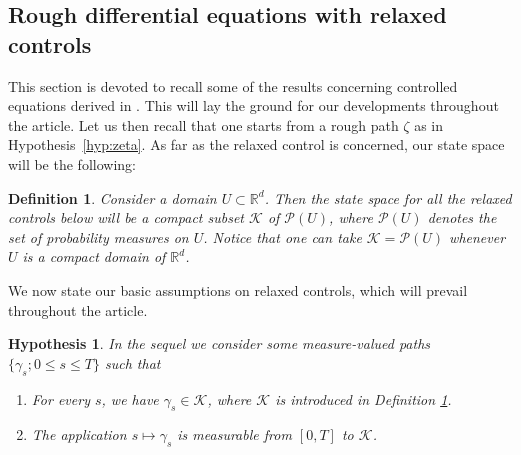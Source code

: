 \documentclass[12pt,reqno]{amsart}
\numberwithin{equation}{section}  %
\newcommand{\1}{{\bf 1}}
\newcommand{\2}{{\bf 2}}
\newcommand{\bzeta}{{\zeta}}
\newcommand{\R}{\mathbb R}
\newcommand{\ck}{\mathcal K}
\newcommand{\cp}{\mathcal P}
\newcommand{\cv}{\mathcal V}
\newcommand{\ga}{\gamma}
\newtheorem{definition}[theorem]{Definition}
\newtheorem{hypothesis}[theorem]{Hypothesis}
\theoremstyle{remark}
\theoremstyle{remark}
\begin{document}
\subsection{Rough differential equations with relaxed controls}
This section is devoted to recall some of the results concerning controlled equations derived in \cite{CHT}. This will lay the ground for our developments throughout the article. Let us then recall that one starts from a rough path $\bzeta$ as in Hypothesis~\ref{hyp:zeta}. 
As far as the relaxed control is concerned, our state space will be the following:
\begin{definition}\label{def:rel-control}
Consider a domain $U \subset \R^d$. Then the state space for all the relaxed controls below will be a compact subset $\ck$ of $\cp(U)$, where $\cp(U)$ denotes the set of probability measures on $U$. Notice that one can take $\ck = \cp(U)$ whenever $U$ is a compact domain of $\R^d$.
\end{definition}
We now state our basic assumptions on relaxed controls, which will prevail throughout the article.
\begin{hypothesis}\label{hyp:rel-control-1}
In the sequel we consider some measure-valued paths $\{ \ga_s; 0 \leq s \leq T \}$ such that
\begin{enumerate}[wide, labelwidth=!, labelindent=0pt, label=\textnormal{(\arabic*)}]
\setlength\itemsep{.05in}
\item For every $s$, we have $\gamma_{s}\in \mathcal{K}$, where $\mathcal{K}$ is introduced in Definition \ref{def:rel-control}.
\item The application $s\mapsto \gamma_{s}$ is measurable from $[0,T]$ to $\mathcal{K}$.
\end{enumerate}
\end{hypothesis}
\end{document}
